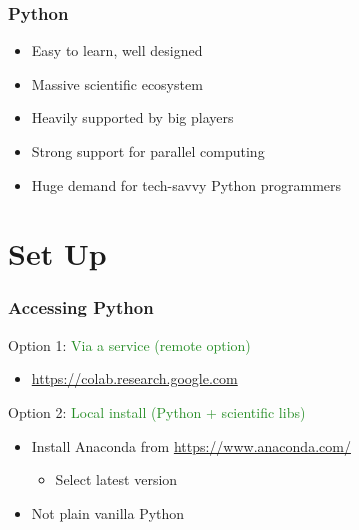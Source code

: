 \documentclass[
    xcolor={svgnames,dvipsnames},
    hyperref={colorlinks, citecolor=DeepPink4, linkcolor=DarkRed, urlcolor=DarkBlue}
    ]{beamer}  %
\newcommand{\green}[1]{\textcolor{ForestGreen}{\sf #1}}
\newcommand{\1}{\mathbbm 1}
\begin{document}
\begin{frame}
    \frametitle{Python}
    
    \begin{itemize}
        \item Easy to learn, well designed
            \vspace{0.5em}
        \item Massive scientific ecosystem
            \vspace{0.5em}
        \item Heavily supported by big players
            \vspace{0.5em}
        \item Strong support for parallel computing
            \vspace{0.5em}
        \item Huge demand for tech-savvy Python programmers
    \end{itemize}


\end{frame}




\section{Set Up}





\begin{frame}
    \frametitle{Accessing Python}

    Option 1: \green{Via a service (remote option)}

    \begin{itemize}
        \item \url{https://colab.research.google.com}
    \end{itemize}

    \vspace{1em}

    Option 2: \green{Local install (Python + scientific libs)}
    
    \begin{itemize}
        \item Install Anaconda from {\footnotesize \url{https://www.anaconda.com/}}
        \vspace{1em}
            \begin{itemize}
                \item Select latest version 
            \end{itemize}
        \vspace{1em}
        \item Not plain vanilla Python
    \end{itemize}




\end{frame}
\end{document}
